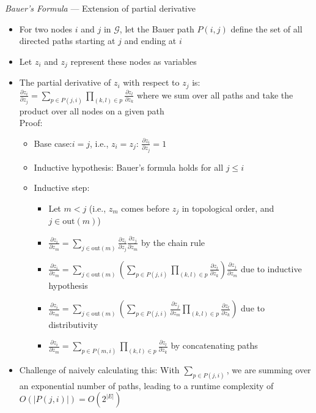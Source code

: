 \emph{Bauer's Formula} --- Extension of partial derivative
\begin{itemize}
    \item For two nodes $i$ and $j$ in $\mathcal{G}$, let the Bauer path $P(i, j)$ define the set of all directed paths starting at $j$ and ending at $i$
    \item Let $z_i$ and $z_j$ represent these nodes as variables
    \item The partial derivative of $z_i$ with respect to $z_j$ is:
    $
    \frac{\partial z_i}{\partial z_j} = \sum_{p \in P(j, i)} \prod_{(k, l) \in p} \frac{\partial z_l}{\partial z_k}
    $ where we sum over all paths and take the product over all nodes on a given path\\
    Proof:
    \begin{itemize}
        \item Base case:$i = j$, i.e., $z_i = z_j$:
        $\frac{\partial z_i}{\partial z_j} = 1$
        \item Inductive hypothesis: Bauer's formula holds for all $j \leq i$
        \item Inductive step:
        \begin{itemize}
            \item Let $m < j$ (i.e., $z_m$ comes before $z_j$ in topological order, and $j \in \textrm{out}(m)$)
            \item $
            \frac{\partial z_i}{\partial z_m} = \sum_{j \in \textrm{out}(m)} \frac{\partial z_i}{\partial z_j} \frac{\partial z_j}{\partial z_m}
            $ by the chain rule
            \item $
            \frac{\partial z_i}{\partial z_m} = \sum_{j \in \textrm{out}(m)} (\sum_{p \in P(j, i)} \prod_{(k, l) \in p} \frac{\partial z_l}{\partial z_k}) \frac{\partial z_j}{\partial z_m}
            $ due to inductive hypothesis
            \item $
            \frac{\partial z_i}{\partial z_m} = \sum_{j \in \textrm{out}(m)} (\sum_{p \in P(j, i)} \frac{\partial z_j}{\partial z_m} \prod_{(k, l) \in p} \frac{\partial z_l}{\partial z_k})
            $ due to distributivity
            \item $
            \frac{\partial z_i}{\partial z_m} = \sum_{p \in P(m, i)} \prod_{(k, l) \in p} \frac{\partial z_l}{\partial z_k}
            $ by concatenating paths
        \end{itemize}
    \end{itemize}
    \item Challenge of naively calculating this: With $\sum_{p \in P(j, i)}$, we are summing over an exponential number of paths, leading to a runtime complexity of $O(|P(j, i)|) = O(2^{|E|})$ 
\end{itemize} 

